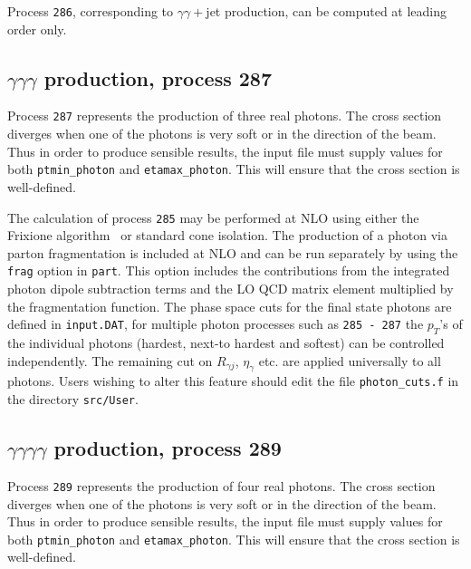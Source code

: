\documentclass[12pt]{article}
\begin{document}
Process {\tt 286}, corresponding to $\gamma\gamma+$jet production, can be computed at leading order only.

\subsection{$\gamma\gamma\gamma$ production, process 287}
\label{subsec:trigam}

Process {\tt 287} represents the production of three real photons.
The cross section diverges
when one of the photons is very soft or in the direction of the beam.
Thus in order to produce sensible results, the input file must supply values for both
{\tt ptmin\_photon} and {\tt etamax\_photon}. This will ensure that
the cross section is well-defined.

The calculation of process {\tt 285} may be performed at NLO using either the
Frixione algorithm~\cite{Frixione:1998jh} or standard cone isolation.  The production of a photon via parton fragmentation is included at NLO and 
can be run separately by using the {\tt frag} option in {\tt part}. This option includes the contributions from the integrated 
photon dipole subtraction terms and the LO QCD matrix element multiplied by the fragmentation function.  
The phase space cuts for the final state photons are defined in {\tt{input.DAT}}, for multiple photon processes such 
as {\tt 285 - 287} the $p_T$'s of the individual photons (hardest, next-to hardest and softest) can be controlled independently. 
The remaining cut on $R_{\gamma j}$, $\eta_{\gamma}$ etc. are applied universally to all photons. Users wishing to alter
this feature should edit the file {\tt{photon\_cuts.f}} in the directory {\tt{src/User}}. 


\subsection{$\gamma\gamma\gamma\gamma$ production, process 289}
\label{subsec:fourgam}

Process {\tt 289} represents the production of four real photons.
The cross section diverges
when one of the photons is very soft or in the direction of the beam.
Thus in order to produce sensible results, the input file must supply values for both
{\tt ptmin\_photon} and {\tt etamax\_photon}. This will ensure that
the cross section is well-defined.
\end{document}
